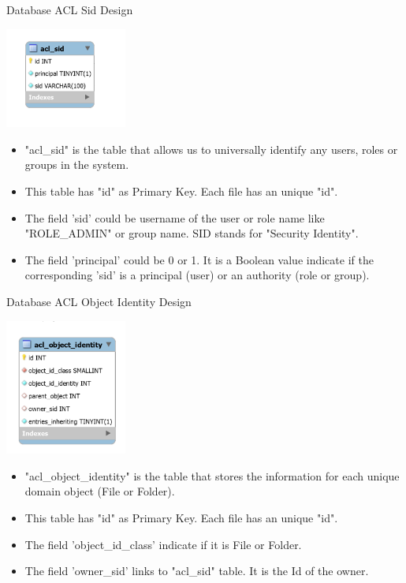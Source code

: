 \begin{table}[H]
  \centering
  \caption{Database ACL Sid Design}
  \label{tbl:dbACL}
  \includegraphics[width=0.3\textwidth]{images/DatabaseAclSidDesign.PNG}
\end{table}
\begin{itemize}
    \item "acl\_sid" is the table that allows us to universally identify any users, roles or groups in the system. 
    \item This table has "id" as Primary Key. Each file has an unique "id".
    \item The field 'sid' could be username of the user or role name like "ROLE\_ADMIN" or group name. SID stands for "Security Identity".
    \item The field 'principal' could be 0 or 1. It is a Boolean value indicate if the corresponding 'sid' is a principal (user) or an authority (role or group). 
\end{itemize}

\begin{table}[H]
  \centering
  \caption{Database ACL Object Identity Design}
  \label{tbl:dbACL}
  \includegraphics[width=0.3\textwidth]{images/DatabaseAclOIDesign.PNG}
\end{table}
\begin{itemize}
    \item "acl\_object\_identity" is the table that stores the information for each unique domain object (File or Folder). 
    \item This table has "id" as Primary Key. Each file has an unique "id".
    \item The field 'object\_id\_class' indicate if it is File or Folder.
    \item The field 'owner\_sid' links to "acl\_sid" table. It is the Id of the owner. 
\end{itemize}

